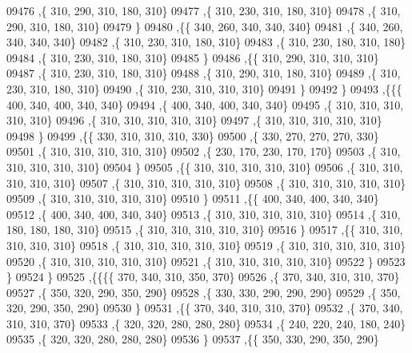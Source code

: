 \begin{DoxyCode}
09476     ,\{   310,   290,   310,   180,   310\}
09477     ,\{   310,   230,   310,   180,   310\}
09478     ,\{   310,   290,   310,   180,   310\}
09479     \}
09480    ,\{\{   340,   260,   340,   340,   340\}
09481     ,\{   340,   260,   340,   340,   340\}
09482     ,\{   310,   230,   310,   180,   310\}
09483     ,\{   310,   230,   180,   310,   180\}
09484     ,\{   310,   230,   310,   180,   310\}
09485     \}
09486    ,\{\{   310,   290,   310,   310,   310\}
09487     ,\{   310,   230,   310,   180,   310\}
09488     ,\{   310,   290,   310,   180,   310\}
09489     ,\{   310,   230,   310,   180,   310\}
09490     ,\{   310,   230,   310,   310,   310\}
09491     \}
09492    \}
09493   ,\{\{\{   400,   340,   400,   340,   340\}
09494     ,\{   400,   340,   400,   340,   340\}
09495     ,\{   310,   310,   310,   310,   310\}
09496     ,\{   310,   310,   310,   310,   310\}
09497     ,\{   310,   310,   310,   310,   310\}
09498     \}
09499    ,\{\{   330,   310,   310,   310,   330\}
09500     ,\{   330,   270,   270,   270,   330\}
09501     ,\{   310,   310,   310,   310,   310\}
09502     ,\{   230,   170,   230,   170,   170\}
09503     ,\{   310,   310,   310,   310,   310\}
09504     \}
09505    ,\{\{   310,   310,   310,   310,   310\}
09506     ,\{   310,   310,   310,   310,   310\}
09507     ,\{   310,   310,   310,   310,   310\}
09508     ,\{   310,   310,   310,   310,   310\}
09509     ,\{   310,   310,   310,   310,   310\}
09510     \}
09511    ,\{\{   400,   340,   400,   340,   340\}
09512     ,\{   400,   340,   400,   340,   340\}
09513     ,\{   310,   310,   310,   310,   310\}
09514     ,\{   310,   180,   180,   180,   310\}
09515     ,\{   310,   310,   310,   310,   310\}
09516     \}
09517    ,\{\{   310,   310,   310,   310,   310\}
09518     ,\{   310,   310,   310,   310,   310\}
09519     ,\{   310,   310,   310,   310,   310\}
09520     ,\{   310,   310,   310,   310,   310\}
09521     ,\{   310,   310,   310,   310,   310\}
09522     \}
09523    \}
09524   \}
09525  ,\{\{\{\{   370,   340,   310,   350,   370\}
09526     ,\{   370,   340,   310,   310,   370\}
09527     ,\{   350,   320,   290,   350,   290\}
09528     ,\{   330,   330,   290,   290,   290\}
09529     ,\{   350,   320,   290,   350,   290\}
09530     \}
09531    ,\{\{   370,   340,   310,   310,   370\}
09532     ,\{   370,   340,   310,   310,   370\}
09533     ,\{   320,   320,   280,   280,   280\}
09534     ,\{   240,   220,   240,   180,   240\}
09535     ,\{   320,   320,   280,   280,   280\}
09536     \}
09537    ,\{\{   350,   330,   290,   350,   290\}

\end{DoxyCode}
